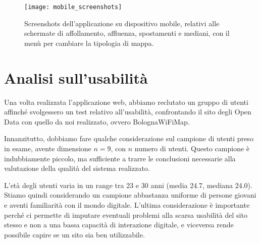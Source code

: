 \begin{figure}[H]
    \centering
    \texttt{[image: mobile\_screenshots]}
    \caption[Screenshots su mobile]{Screenshots dell'applicazione su dispositivo mobile, relativi alle schermate di affollamento, affluenza, spostamenti e mediani, con il menù per cambiare la tipologia di mappa.}
    \label{fig:mobile}
\end{figure}

\section{Analisi sull'usabilità}


Una volta realizzata l'applicazione web, abbiamo reclutato un gruppo di utenti affinché svolgessero un test relativo all'usabilità, confrontando il sito degli Open Data con quello da noi realizzato, ovvero BolognaWiFiMap.

Innanzitutto, dobbiamo fare qualche considerazione sul campione di utenti preso in esame, avente dimensione \( n = 9 \), con \( n \) numero di utenti. Questo campione è indubbiamente piccolo, ma sufficiente a trarre le conclusioni necessarie alla valutazione della qualità del sistema realizzato.

L'età degli utenti varia in un range tra 23 e 30 anni (media 24.7, mediana 24.0). Stiamo quindi considerando un campione abbastanza uniforme di persone giovani e aventi familiarità con il mondo digitale. L'ultima considerazione è importante perché ci permette di imputare eventuali problemi alla scarsa usabilità del sito stesso e non a una bassa capacità di interazione digitale, e viceversa rende possibile capire se un sito sia ben utilizzabile.

